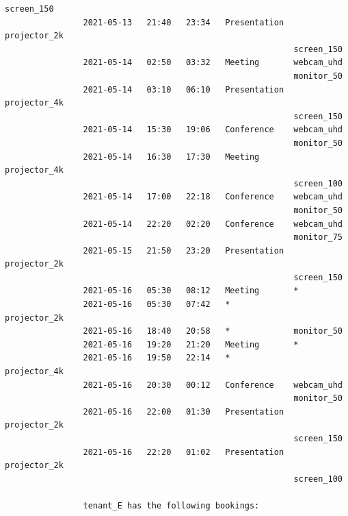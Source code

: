 \documentclass{article}
\begin{document}
\begin{Verbatim}[gobble=8]
                                                           screen_150
                2021-05-13   21:40   23:34   Presentation  projector_2k
                                                           screen_150
                2021-05-14   02:50   03:32   Meeting       webcam_uhd
                                                           monitor_50
                2021-05-14   03:10   06:10   Presentation  projector_4k
                                                           screen_150
                2021-05-14   15:30   19:06   Conference    webcam_uhd
                                                           monitor_50
                2021-05-14   16:30   17:30   Meeting       projector_4k
                                                           screen_100
                2021-05-14   17:00   22:18   Conference    webcam_uhd
                                                           monitor_50
                2021-05-14   22:20   02:20   Conference    webcam_uhd
                                                           monitor_75
                2021-05-15   21:50   23:20   Presentation  projector_2k
                                                           screen_150
                2021-05-16   05:30   08:12   Meeting       *
                2021-05-16   05:30   07:42   *             projector_2k
                2021-05-16   18:40   20:58   *             monitor_50
                2021-05-16   19:20   21:20   Meeting       *
                2021-05-16   19:50   22:14   *             projector_4k
                2021-05-16   20:30   00:12   Conference    webcam_uhd
                                                           monitor_50
                2021-05-16   22:00   01:30   Presentation  projector_2k
                                                           screen_150
                2021-05-16   22:20   01:02   Presentation  projector_2k
                                                           screen_100
                
                tenant_E has the following bookings:
                

\end{Verbatim}
\end{document}
